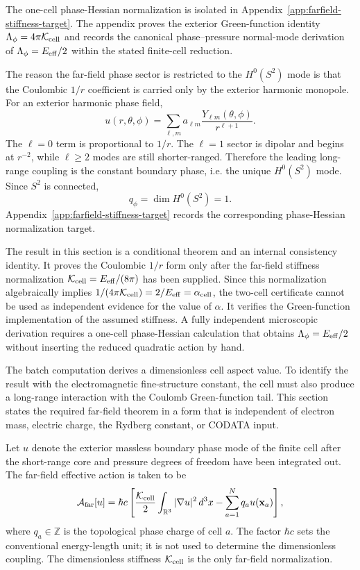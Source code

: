 \documentclass[11pt]{article}
\newcommand{\Kcell}{\mathcal K_{\rm cell}}
\newcommand{\Afar}{\mathcal A_{\rm far}}
\begin{document}
The one-cell phase-Hessian normalization is isolated in Appendix~\ref{app:farfield-stiffness-target}. The appendix proves the exterior Green-function identity \(\Lambda_\phi=4\pi\mathcal K_{\rm cell}\) and records the canonical phase--pressure normal-mode derivation of \(\Lambda_\phi=E_{\rm eff}/2\) within the stated finite-cell reduction.


The reason the far-field phase sector is restricted to the \(H^0(S^2)\) mode is
that the Coulombic \(1/r\) coefficient is carried only by the exterior harmonic
monopole.  For an exterior harmonic phase field,
\[
  u(r,\theta,\phi)
  =
  \sum_{\ell,m}
  a_{\ell m}\frac{Y_{\ell m}(\theta,\phi)}{r^{\ell+1}}.
\]
The \(\ell=0\) term is proportional to \(1/r\).  The \(\ell=1\) sector is
dipolar and begins at \(r^{-2}\), while \(\ell\ge2\) modes are still
shorter-ranged.  Therefore the leading long-range coupling is the constant
boundary phase, i.e. the unique \(H^0(S^2)\) mode.  Since \(S^2\) is connected,
\[
  q_\phi=\dim H^0(S^2)=1.
\]
Appendix~\ref{app:farfield-stiffness-target} records the corresponding
phase-Hessian normalization target.


\label{sec:farfield-theorem}

The result in this section is a conditional theorem and an internal
consistency identity.  It proves the Coulombic \(1/r\) form only after the
far-field stiffness normalization
\(\mathcal K_{\rm cell}=E_{\rm eff}/(8\pi)\) has been supplied.  Since this
normalization algebraically implies
\(1/(4\pi\mathcal K_{\rm cell})=2/E_{\rm eff}=\alpha_{\rm cell}\), the
two-cell certificate cannot be used as independent evidence for the value of
\(\alpha\).  It verifies the Green-function implementation of the assumed
stiffness.  A fully independent microscopic derivation requires a one-cell
phase-Hessian calculation that obtains \(\Lambda_\phi=E_{\rm eff}/2\) without
inserting the reduced quadratic action by hand.

\label{sec:farfield}

The batch computation derives a dimensionless cell aspect value. To identify the result with the electromagnetic fine-structure constant, the cell must also produce a long-range interaction with the Coulomb Green-function tail. This section states the required far-field theorem in a form that is independent of electron mass, electric charge, the Rydberg constant, or CODATA input.

Let \(u\) denote the exterior massless boundary phase mode of the finite cell after the short-range core and pressure degrees of freedom have been integrated out. The far-field effective action is taken to be
\begin{equation}
\Afar[u]
=
\hbar c\left[
\frac{\Kcell}{2}
\int_{\mathbb R^3} |\nabla u|^2\,d^3x
-
\sum_{a=1}^{N} q_a u(\mathbf x_a)
\right],
\label{eq:far-action}
\end{equation}
where \(q_a\in\mathbb Z\) is the topological phase charge of cell \(a\). The factor \(\hbar c\) sets the conventional energy-length unit; it is not used to determine the dimensionless coupling. The dimensionless stiffness \(\Kcell\) is the only far-field normalization.
\end{document}
